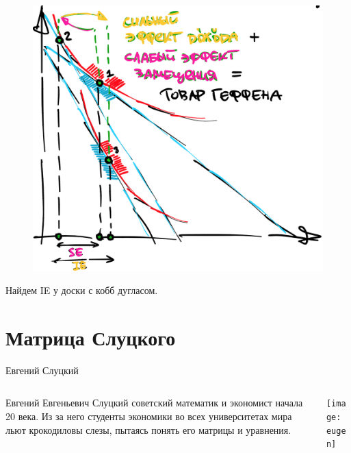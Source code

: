 \documentclass{beamer}
\begin{document}
\begin{frame}
\begin{figure}[hbt]
\centering
\includegraphics[width=.8 \textwidth]{IESE_CV.png}
\end{figure}

\end{frame}

\begin{frame}

Найдем IE у доски с кобб дугласом.

\end{frame}

\section{Матрица Слуцкого}

 \begin{frame}{Евгений Слуцкий}
 \begin{columns}
 \begin{column}{0.5\textwidth}
    \alert{Евгений Евгеньевич Слуцкий} советский математик и экономист начала 20 века. Из за него студенты экономики во всех университетах мира льют крокодиловы слезы, пытаясь понять его матрицы и уравнения.
 \end{column}
 \begin{column}{0.5\textwidth}  %
     \begin{center}
      \texttt{[image: eugen]}
      \end{center}
 \end{column}
 \end{columns}
 \end{frame}
 
\end{document}
